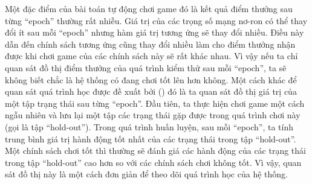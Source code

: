 	Một đặc điểm của bài toán tự động chơi game đó là kết quả điểm thưởng sau từng ``epoch'' thường rất nhiễu.
	Giá trị của các trọng số mạng nơ-ron có thể thay đổi ít sau mỗi ``epoch'' nhưng hàm giá trị tương ứng sẽ thay đổi nhiều.
	Điều này dẫn đến chính sách tương ứng cũng thay đổi nhiều làm cho điểm thưởng nhận được khi chơi game của các chính sách này sẽ rất khác nhau.
	Vì vậy nếu ta chỉ quan sát đồ thị điểm thưởng của quá trình kiểm thử sau mỗi ``epoch'', ta sẽ không biết chắc là hệ thống có đang chơi tốt lên hơn không.
	Một cách khác để quan sát quá trình học được đề xuất bởi (\cite{mnih2013playing}) đó là ta quan sát đồ thị giá trị của một tập trạng thái sau từng ``epoch''.
	Đầu tiên, ta thực hiện chơi game một cách ngẫu nhiên và lưu lại một tập các trạng thái gặp được trong quá trình chơi này (gọi là tập ``hold-out'').
	Trong quá trình huấn luyện, sau mỗi ``epoch'', ta tính trung bình giá trị hành động tốt nhất của các trạng thái trong tập ``hold-out''.
	Một chính sách chơi tốt thì thường sẽ đánh giá các hành động của các trạng thái trong tập ``hold-out'' cao hơn so với các chính sách chơi không tốt.
	Vì vậy, quan sát đồ thị này là một cách đơn giản để theo dõi quá trình học của hệ thống.
